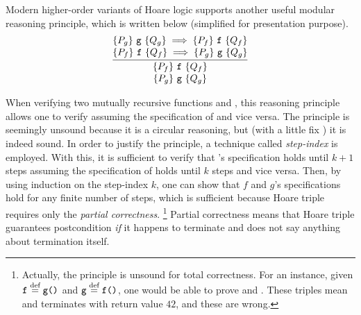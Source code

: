 Modern higher-order variants of Hoare logic\cite{VST,appel:plcc} supports another useful modular reasoning principle, which is written below (simplified for presentation purpose).%
\[
\infer
    {\deduce{\hoare{P_{g}}{\code{g}}{Q_{g}}}{\hoare{P_{f}}{\code{f}}{Q_{f}}}}
    {\deduce{\hoare{P_{f}}{\code{f}}{Q_{f}} \implies \hoare{P_{g}}{\code{g}}{Q_{g}}}
            {\hoare{P_{g}}{\code{g}}{Q_{g}} \implies \hoare{P_{f}}{\code{f}}{Q_{f}}}
    }
\]

\noindent When verifying two mutually recursive functions  and , this reasoning principle allows one to verify  assuming the specification of  and vice versa.
The principle is seemingly unsound because it is a circular reasoning, but (with a little fix%
) it is indeed sound. %
In order to justify the principle, a technique called {\it step-index} is employed.
With this, it is sufficient to verify that 's specification holds until $k+1$ steps assuming the specification of  holds until $k$ steps and vice versa.
Then, by using induction on the step-index $k$, one can show that $f$ and $g$'s specifications hold for any finite number of steps, which is sufficient because Hoare triple requires only the {\it partial correctness}.
\footnote{Actually, the principle is unsound for total correctness. For an instance, given $\texttt{f} \stackrel{\text{def}}{=} \texttt{g()}$ and $\texttt{g} \stackrel{\text{def}}{=} \texttt{f()}$, one would be able to prove  and .
  These triples mean  and  terminates with return value $42$, and these are wrong. }
Partial correctness means that Hoare triple guarantees postcondition {\it if} it happens to terminate and does not say anything about termination itself.




